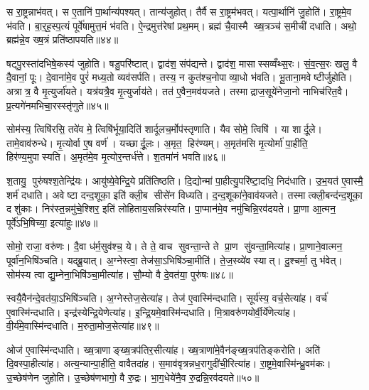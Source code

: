 स रा॒ष्ट्रन्नाभ॑वत्। स ए॒तानि॑ पा॒र्थान्य॑पश्यत्। तान्य॑जुहोत्। तैर्वै स रा॒ष्ट्रम॑भवत्। यत्पा॒र्थानि॑ जु॒होति॑। रा॒ष्ट्रमे॒व भ॑वति। बा॒र्॒ह॒स्प॒त्यं पूर्वे॑षामुत्त॒मं भ॑वति। ऐ॒न्द्रमुत्त॑रेषां प्रथ॒मम्। ब्रह्म॑ चै॒वास्मै ख्ष॒त्रञ्च॑ स॒मीची॑ दधाति। अथो॒ ब्रह्म॑न्ने॒व ख्ष॒त्रं प्रति॑ष्ठापयति॥४४॥

षट्पु॒रस्ता॑दभिषे॒कस्य॑ जुहोति। षडु॒परि॑ष्टात्। द्वाद॑श॒ संप॑द्यन्ते। द्वाद॑श॒ मासास्सव्वँथ्स॒रः। सं॒व॒त्स॒रः खलु॒ वै दै॒वानां॒ पूः। दे॒वाना॑मे॒व पुरं॑ मध्य॒तो व्यव॑सर्पति। तस्य॒ न कुत॑श्च॒नोपाव्या॒धो भ॑वति। भू॒ताना॒मवेष्टीर्जुहोति। अत्रात्र॒ वै मृ॒त्युर्जा॑यते। यत्र॑यत्रै॒व मृ॒त्युर्जाय॑ते। तत॑ ए॒वैन॒मव॑यजते। तस्माद्राज॒सूये॑नेजा॒नो नाभिच॑रित॒वै। प्र॒त्यगे॑नमभिचा॒रस्स्तृ॑णुते॥४५॥\anuvakamend[रु॒न्धे॒ सम॑ष्ट्या असिच्यत स्थापयति॒ जाय॑ते॒ पञ्च॑ च]

सोम॑स्य॒ त्विषि॑रसि॒ तवे॑व मे॒ त्विषि॑र्भूया॒दिति॑ शार्दूलच॒र्मोप॑स्तृणाति। यैव सोमे॒ त्विषि॑। या शार्दू॒ले। तामे॒वाव॑रुन्धे। मृ॒त्योर्वा ए॒ष वर्ण॑। यच्छार्दू॒लः। अ॒मृत॒ हिर॑ण्यम्। अ॒मृत॑मसि मृ॒त्योर्मा॑ पा॒हीति॒ हिर॑ण्य॒मुपास्यति। अ॒मृत॑मे॒व मृ॒त्योर॒न्तर्ध॑त्ते। श॒तमा॑नं भवति॥४६॥

श॒तायु॒ पुरु॑षश्श॒तेन्द्रि॑यः। आयु॑ष्ये॒वेन्द्रि॒ये प्रति॑तिष्ठति। दि॒द्योन्मा॑ पा॒हीत्यु॒परि॑ष्टा॒दधि॒ निद॑धाति। उ॒भ॒यत॑ ए॒वास्मै॒ शर्म॑ दधाति। अवेष्टा दन्द॒शूका॒ इति॑ क्ली॒ब सीसे॑न विध्यति। द॒न्द॒शूका॑ने॒वाव॑यजते। तस्मात्क्ली॒बन्द॑न्द॒शूका॒ दशु॑काः। निर॑स्त॒न्नमु॑चे॒श्शिर॒ इति॑ लोहिताय॒सन्निर॑स्यति। पा॒प्मान॑मे॒व नमु॑चिन्नि॒रव॑दयते। प्रा॒णा आ॒त्मन॒ पूर्वे॑ऽभि॒षिच्या॒ इत्या॑हुः॥४७॥

सोमो॒ राजा॒ वरु॑णः। दै॒वा ध॑र्म॒सुव॑श्च॒ ये। ते ते॒ वाच सुवन्ता॒न्ते ते प्रा॒ण सु॑वन्ता॒मित्या॑ह। प्रा॒णाने॒वात्मन॒ पूर्वा॑न॒भिषि॑ञ्चति। यद्ब्रू॒यात्। अ॒ग्नेस्त्वा॒ तेज॑सा॒ऽभिषि॑ञ्चा॒मीति॑। ते॒ज॒स्व्ये॑व स्यात्। दु॒श्चर्मा॒ तु भ॑वेत्। सोम॑स्य त्वा द्यु॒म्नेना॒भिषि॑ञ्चा॒मीत्या॑ह। सौ॒म्यो वै दे॒वत॑या॒ पुरु॑षः॥४८॥

स्वयै॒वैन॑न्दे॒वत॑या॒ऽभिषि॑ञ्चति। अ॒ग्नेस्तेज॒सेत्या॑ह। तेज॑ ए॒वास्मि॑न्दधाति। सूर्य॑स्य॒ वर्च॒सेत्या॑ह। वर्च॑ ए॒वास्मि॑न्दधाति। इन्द्र॑स्येन्द्रि॒येणेत्या॑ह। इ॒न्द्रि॒यमे॒वास्मि॑न्दधाति। मि॒त्रावरु॑णयोर्वी॒र्ये॑णेत्या॑ह। वी॒र्य॑मे॒वास्मि॑न्दधाति। म॒रुता॒मोज॒सेत्या॑ह॥४९॥

ओज॑ ए॒वास्मि॑न्दधाति। ख्ष॒त्राणाङ्ख्ष॒त्रप॑तिर॒सीत्या॑ह। ख्ष॒त्राणा॑मे॒वैन॑ङ्ख्ष॒त्रप॑तिङ्करोति। अति॑ दि॒वस्पा॒हीत्या॑ह। अत्य॒न्यान्पा॒हीति॒ वावैतदा॑ह। स॒माव॑वृत्रन्नध॒रागुदी॑ची॒रित्या॑ह। रा॒ष्ट्रमे॒वास्मि॑न्ध्रु॒वम॑कः। उ॒च्छेष॑णेन जुहोति। उ॒च्छेष॑णभागो॒ वै रु॒द्रः। भा॒ग॒धेये॑नै॒व रु॒द्रन्नि॒रव॑दयते॥५०॥

